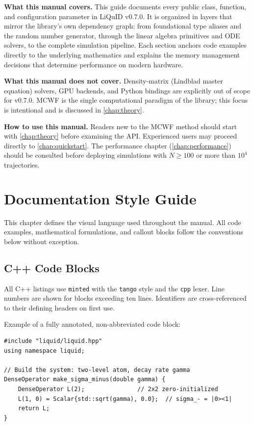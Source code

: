 \documentclass[11pt,a4paper,twoside]{book}
\theoremstyle{definition}
\theoremstyle{remark}
\begin{document}
\medskip
\textbf{What this manual covers.}
This guide documents every public class, function, and configuration parameter
in LiQuID v0.7.0. It is organized in layers that mirror the library's own
dependency graph: from foundational type aliases and the random number generator,
through the linear algebra primitives and ODE solvers, to the complete
simulation pipeline. Each section anchors code examples directly to the
underlying mathematics and explains the memory management decisions that
determine performance on modern hardware.

\medskip
\textbf{What this manual does not cover.}
Density-matrix (Lindblad master equation) solvers, GPU backends, and
Python bindings are explicitly out of scope for v0.7.0. MCWF is the
single computational paradigm of the library; this focus is intentional
and is discussed in \cref{chap:theory}.

\medskip
\textbf{How to use this manual.}
Readers new to the MCWF method should start with \cref{chap:theory} before
examining the API. Experienced users may proceed directly to \cref{chap:quickstart}.
The performance chapter (\cref{chap:performance}) should be consulted before
deploying simulations with $N \geq 100$ or more than $10^4$ trajectories.

\chapter*{Documentation Style Guide}

This chapter defines the visual language used throughout the manual.
All code examples, mathematical formulations, and callout blocks follow
the conventions below without exception.

\section*{C++ Code Blocks}

All C++ listings use \texttt{minted} with the \texttt{tango} style and the
\texttt{cpp} lexer. Line numbers are shown for blocks exceeding ten lines.
Identifiers are cross-referenced to their defining headers on first use.

Example of a fully annotated, non-abbreviated code block:

\begin{verbatim}
#include "liquid/liquid.hpp"
using namespace liquid;

// Build the system: two-level atom, decay rate gamma
DenseOperator make_sigma_minus(double gamma) {
    DenseOperator L(2);               // 2x2 zero-initialized
    L(1, 0) = Scalar{std::sqrt(gamma), 0.0};  // sigma_- = |0><1|
    return L;
}
\end{verbatim}
\end{document}
